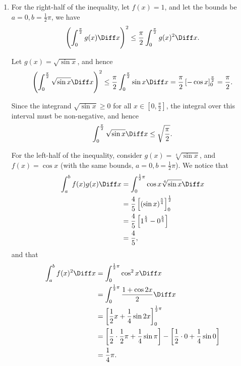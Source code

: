 \begin{enumerate}
    \item For the right-half of the inequality, let \(f(x) = 1\), and let the bounds be \(a = 0, b = \frac{1}{2}\pi\), we have
          \[
              \left(\int_{0}^{\frac{\pi}{2}} g(x) \Diff x\right)^2 \leq \frac{\pi}{2} \int_{0}^{\frac{\pi}{2}} g(x)^2 \Diff x.
          \]

          Let \(g(x) = \sqrt{\sin x}\), and hence
          \[
              \left(\int_{0}^{\frac{\pi}{2}} \sqrt{\sin x} \Diff x\right)^2 \leq \frac{\pi}{2} \int_{0}^{\frac{\pi}{2}} \sin x \Diff x = \frac{\pi}{2} \left[- \cos x\right]_{0}^{\frac{\pi}{2}} = \frac{\pi}{2}.
          \]

          Since the integrand \(\sqrt{\sin x} \geq 0\) for all \(x \in \left[0, \frac{\pi}{2}\right]\), the integral over this interval must be non-negative, and hence
          \[
              \int_{0}^{\frac{\pi}{2}} \sqrt{\sin x} \Diff x \leq \sqrt{\frac{\pi}{2}}.
          \]

          For the left-half of the inequality, consider \(g(x) = \sqrt[4]{\sin x}\), and \(f(x) = \cos x\) (with the same bounds, \(a = 0, b = \frac{1}{2}\pi\)). We notice that
          \begin{align*}
              \int_{a}^{b} f(x) g(x) \Diff x & = \int_{0}^{\frac{1}{2} \pi} \cos x \sqrt[4] {\sin x} \Diff x                  \\
                                             & = \frac{4}{5} \left[\left(\sin x\right)^{\frac{5}{4}}\right]_{0}^{\frac{1}{2}} \\
                                             & = \frac{4}{5} \left[1^{\frac{5}{4}} - 0^{\frac{5}{4}}\right]                   \\
                                             & = \frac{4}{5},
          \end{align*}
          and that
          \begin{align*}
              \int_{a}^{b} f(x)^2 \Diff x & = \int_{0}^{\frac{1}{2} \pi} \cos^2 x \Diff x                                                                                   \\
                                          & = \int_{0}^{\frac{1}{2} \pi} \frac{1 + \cos 2x}{2} \Diff x                                                                      \\
                                          & = \left[\frac{1}{2}x + \frac{1}{4} \sin 2x\right]_{0}^{\frac{1}{2}\pi}                                                          \\
                                          & = \left[\frac{1}{2} \cdot \frac{1}{2} \pi + \frac{1}{4} \sin \pi\right] - \left[\frac{1}{2} \cdot 0 + \frac{1}{4} \sin 0\right] \\
                                          & = \frac{1}{4} \pi.
          \end{align*}


\end{enumerate}
